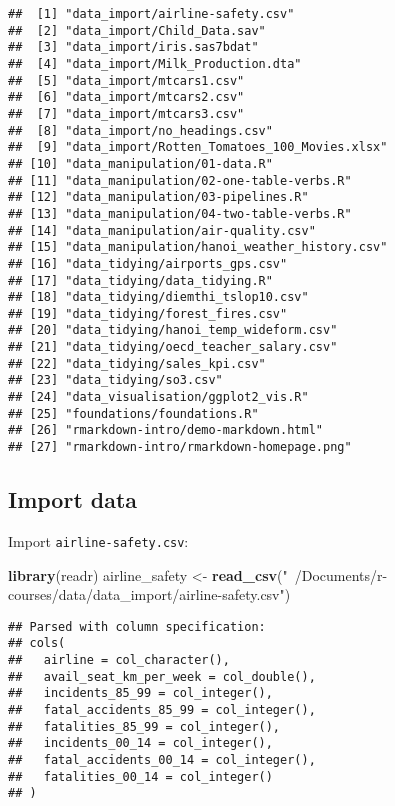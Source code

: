 \documentclass[]{article}
\newenvironment{Shaded}{\begin{snugshade}}{\end{snugshade}}
\newcommand{\KeywordTok}[1]{\textcolor[rgb]{0.13,0.29,0.53}{\textbf{#1}}}
\newcommand{\StringTok}[1]{\textcolor[rgb]{0.31,0.60,0.02}{#1}}
\newcommand{\NormalTok}[1]{#1}
\begin{document}
\begin{verbatim}
##  [1] "data_import/airline-safety.csv"             
##  [2] "data_import/Child_Data.sav"                 
##  [3] "data_import/iris.sas7bdat"                  
##  [4] "data_import/Milk_Production.dta"            
##  [5] "data_import/mtcars1.csv"                    
##  [6] "data_import/mtcars2.csv"                    
##  [7] "data_import/mtcars3.csv"                    
##  [8] "data_import/no_headings.csv"                
##  [9] "data_import/Rotten_Tomatoes_100_Movies.xlsx"
## [10] "data_manipulation/01-data.R"                
## [11] "data_manipulation/02-one-table-verbs.R"     
## [12] "data_manipulation/03-pipelines.R"           
## [13] "data_manipulation/04-two-table-verbs.R"     
## [14] "data_manipulation/air-quality.csv"          
## [15] "data_manipulation/hanoi_weather_history.csv"
## [16] "data_tidying/airports_gps.csv"              
## [17] "data_tidying/data_tidying.R"                
## [18] "data_tidying/diemthi_tslop10.csv"           
## [19] "data_tidying/forest_fires.csv"              
## [20] "data_tidying/hanoi_temp_wideform.csv"       
## [21] "data_tidying/oecd_teacher_salary.csv"       
## [22] "data_tidying/sales_kpi.csv"                 
## [23] "data_tidying/so3.csv"                       
## [24] "data_visualisation/ggplot2_vis.R"           
## [25] "foundations/foundations.R"                  
## [26] "rmarkdown-intro/demo-markdown.html"         
## [27] "rmarkdown-intro/rmarkdown-homepage.png"
\end{verbatim}

\subsection{Import data}\label{import-data}

Import \texttt{airline-safety.csv}:

\begin{Shaded}
\begin{Highlighting}[]
\KeywordTok{library}\NormalTok{(readr)}
\NormalTok{airline_safety <-}\StringTok{ }\KeywordTok{read_csv}\NormalTok{(}\StringTok{"~/Documents/r-courses/data/data_import/airline-safety.csv"}\NormalTok{)}
\end{Highlighting}
\end{Shaded}

\begin{verbatim}
## Parsed with column specification:
## cols(
##   airline = col_character(),
##   avail_seat_km_per_week = col_double(),
##   incidents_85_99 = col_integer(),
##   fatal_accidents_85_99 = col_integer(),
##   fatalities_85_99 = col_integer(),
##   incidents_00_14 = col_integer(),
##   fatal_accidents_00_14 = col_integer(),
##   fatalities_00_14 = col_integer()
## )
\end{verbatim}
\end{document}
